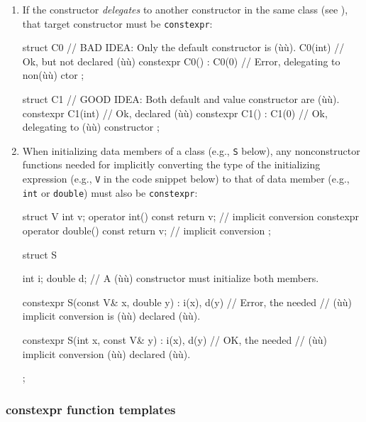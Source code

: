 \begin{enumerate}
\item{If the constructor \emph{delegates} to another constructor in the same class (see ), that target constructor must be \lstinline!constexpr!:

\begin{emcppslisting} %
struct C0  // BAD IDEA: Only the default constructor is (ù{}ù).
{
              C0(int)      { }  // Ok, but not declared (ù{}ù)
    constexpr C0() : C0(0) { }  // Error, delegating to non(ù{}ù) ctor
};

struct C1  // GOOD IDEA: Both default and value constructor are (ù{}ù).
{
    constexpr C1(int)      { }  // Ok, declared (ù{}ù)
    constexpr C1() : C1(0) { }  // Ok, delegating to (ù{}ù) constructor
};
\end{emcppslisting}
}
    

\item{When initializing data members of a class (e.g., \lstinline!S! below), any nonconstructor functions needed for implicitly converting the type of the initializing expression (e.g., \lstinline!V! in the code snippet below) to that of data member (e.g., \lstinline!int! or \lstinline!double!) must also be \lstinline!constexpr!:

\begin{emcppslisting} %
struct V
{
    int v;
              operator    int() const { return v; }  // implicit conversion
    constexpr operator double() const { return v; }  // implicit conversion
};

struct S
{
    int i; double d;  // A (ù{}ù) constructor must initialize both members.

    constexpr S(const V& x, double y) : i(x), d(y) { }  // Error, the needed
        // (ù{}ù) implicit conversion is (ù{}ù) declared (ù{}ù).

    constexpr S(int x, const V& y) : i(x), d(y) { }    // OK, the needed
        // (ù{}ù) implicit conversion (ù{}ù) declared (ù{}ù).
};
\end{emcppslisting}
}
\end{enumerate}
    

\subsubsection[\lstinline!constexpr! function templates]{{\SubsubsecCode constexpr} function templates}\label{constexpr-function-templates}

